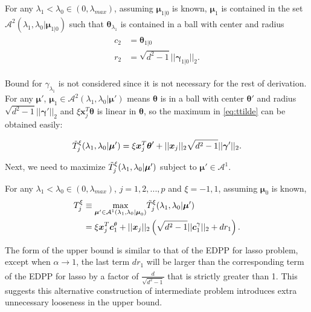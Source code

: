 \begin{theorem}
    \label{thm:1.3.alt}
    For any $\lambda_1<\lambda_{0}\in (0,\lambda_{max})$, assuming $\boldsymbol\mu_{1|0}$ is known, $\boldsymbol\mu_1$ is contained in the set $\mathcal{A}^2(\lambda_1,\lambda_0|\boldsymbol\mu_{1|0})$ such that $\boldsymbol\theta_{\lambda_1}$ is contained in a ball with center and radius
    \begin{gather}
        \begin{aligned}
            c_2&=\boldsymbol\theta_{1|0}\\
            r_2&=\sqrt{d^2-1}||\boldsymbol\gamma_{1|0}||_2.
        \end{aligned}
    \end{gather}
\end{theorem}
Bound for $\gamma_{\lambda_1}$ is not considered since it is not necessary for the rest of derivation. For any $\boldsymbol\mu'$, $\boldsymbol\mu_1\in\mathcal{A}^2(\lambda_1,\lambda_0|\boldsymbol\mu')$ means $\boldsymbol\theta$ is in a ball with center $\boldsymbol\theta'$ and radius $\sqrt{d^2-1}||\boldsymbol\gamma'||_2$ and $\xi \boldsymbol x_j^T\boldsymbol\theta$ is linear in $\boldsymbol\theta$, so the maximum in \eqref{eq:ttilde} can be obtained easily:

\begin{equation}
    \label{eq:ttildexi.alt}
    \Tilde{T}^\xi_j(\lambda_1,\lambda_0|\boldsymbol\mu')=\xi \boldsymbol x_j^T\boldsymbol\theta'+||\boldsymbol x_j||_2\sqrt{d^2-1}||\boldsymbol\gamma'||_2.
\end{equation}

Next, we need to maximize $\Tilde{T}^\xi_j(\lambda_1,\lambda_0|\boldsymbol\mu')$ subject to $\boldsymbol\mu'\in\mathcal{A}^1$.

\begin{theorem}
    \label{thm:2.1.alt}
    For any $\lambda_1<\lambda_{0}\in (0,\lambda_{max})$, $j=1,2,...,p$ and $\xi=-1,1$, assuming $\boldsymbol\mu_0$ is known,
    \begin{gather}
        \begin{aligned}
            T^\xi_j&\equiv\underset{\boldsymbol\mu'\in\mathcal{A}^1(\lambda_1,\lambda_0|\boldsymbol\mu_0)}{\mathrm{max}}\Tilde{T}^\xi_j(\lambda_1,\lambda_0|\boldsymbol\mu')\\
            &=\xi \boldsymbol x_j^T \boldsymbol c_1^\theta+||\boldsymbol x_j||_2\left(\sqrt{d^2-1}||\boldsymbol c_1^\gamma||_2+dr_1\right).
        \end{aligned}
    \end{gather}
\end{theorem}

The form of the upper bound is similar to that of the EDPP for lasso problem, except when $\alpha\xrightarrow[]{}1$, the last term $dr_1$ will be larger than the corresponding term of the EDPP for lasso by a factor of $\frac{d}{\sqrt{d^2-1}}$ that is strictly greater than 1. This suggests this alternative construction of intermediate problem introduces extra unnecessary looseness in the upper bound.